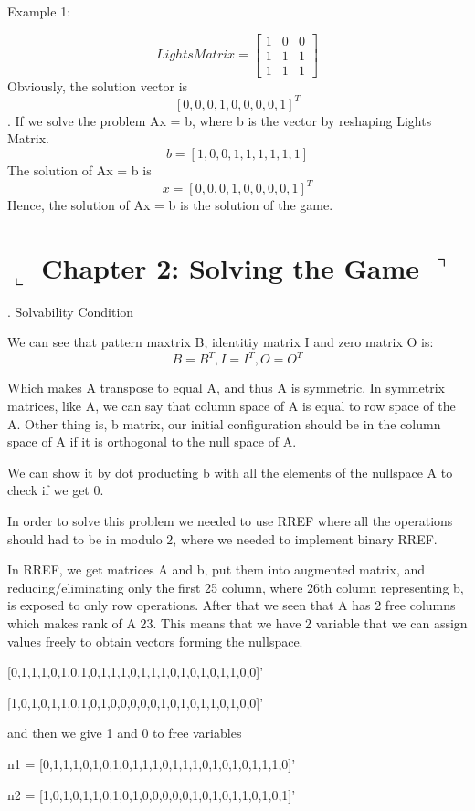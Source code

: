 \documentclass[]{article}
\begin{document}
Example 1:

$$
LightsMatrix = \begin{bmatrix} 1 & 0 & 0 \\ 1 & 1 & 1 \\ 1 & 1 & 1\end{bmatrix} 
$$ 
Obviously, the solution vector is $$[0,0,0,1,0,0,0,0,1]^{T}$$.
If we solve the problem Ax = b, where b is the vector by reshaping Lights Matrix.$$b = [1,0,0,1,1,1,1,1,1]$$
The solution of Ax = b is $$x = [0,0,0,1,0,0,0,0,1]^{T}$$
Hence, the solution of Ax = b is the solution of the game.

\section*{ $\llcorner$  Chapter 2: Solving the Game $\urcorner$}

. Solvability Condition

We can see that pattern maxtrix B, identitiy matrix I and zero matrix O is: $$B = B^T, I = I^T, O = O^T $$

Which makes A transpose to equal A, and thus A is symmetric. In symmetrix matrices, like A, we can say that column space of A is equal to row space of the A. Other thing is, b matrix, our initial configuration should be in the column space of A if it is orthogonal to the null space of A. 

We can show it by dot producting b with all the elements of the nullspace A to check
if we get 0.

In order to solve this problem we needed to use RREF where all the operations
should had to be in modulo 2, where we needed to implement binary RREF.

In RREF, we get matrices A and b, put them into augmented matrix, and reducing/eliminating only the first 25 column, where 26th column representing b, is exposed to only row operations. After that we seen that A has 2 free columns which makes rank of A 23. This means that we have 2 variable that we can assign values freely to obtain vectors forming the nullspace.

[0,1,1,1,0,1,0,1,0,1,1,1,0,1,1,1,0,1,0,1,0,1,1,0,0]'

[1,0,1,0,1,1,0,1,0,1,0,0,0,0,0,1,0,1,0,1,1,0,1,0,0]'

and then we give 1 and 0 to free variables

n1 = [0,1,1,1,0,1,0,1,0,1,1,1,0,1,1,1,0,1,0,1,0,1,1,1,0]'

n2 = [1,0,1,0,1,1,0,1,0,1,0,0,0,0,0,1,0,1,0,1,1,0,1,0,1]'
\end{document}
